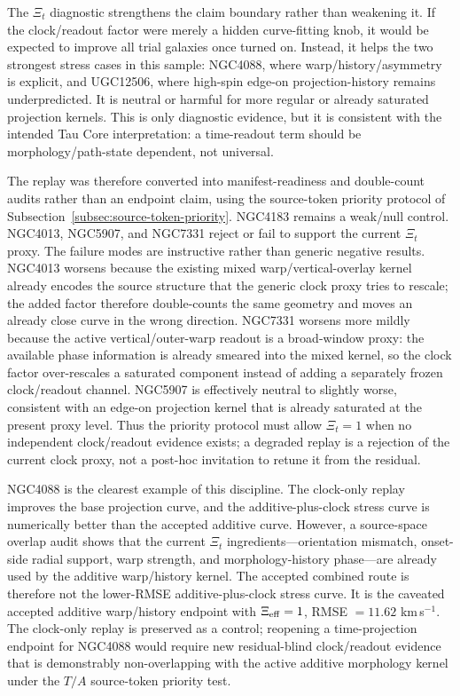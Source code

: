 \documentclass[11pt]{article}
\begin{document}
The \(\Xi_t\) diagnostic strengthens the claim boundary rather than weakening
it.  If the clock/readout factor were merely a hidden curve-fitting knob, it
would be expected to improve all trial galaxies once turned on.  Instead, it
helps the two strongest stress cases in this sample: NGC4088, where
warp/history/asymmetry is explicit, and UGC12506, where high-spin edge-on
projection-history remains underpredicted.  It is neutral or harmful for more
regular or already saturated projection kernels.  This is only diagnostic
evidence, but it is consistent with the intended Tau Core interpretation: a
time-readout term should be morphology/path-state dependent, not universal.

The replay was therefore converted into manifest-readiness and double-count
audits rather than an endpoint claim, using the source-token priority protocol
of Subsection~\ref{subsec:source-token-priority}.  NGC4183 remains a weak/null control.
NGC4013, NGC5907, and NGC7331 reject or fail to support the current
\(\Xi_t\) proxy.  The failure modes are instructive rather than generic
negative results.  NGC4013 worsens because the existing mixed
warp/vertical-overlay kernel already encodes the source structure that the
generic clock proxy tries to rescale; the added factor therefore double-counts
the same geometry and moves an already close curve in the wrong direction.
NGC7331 worsens more mildly because the active vertical/outer-warp readout is
a broad-window proxy: the available phase information is already smeared into
the mixed kernel, so the clock factor over-rescales a saturated component
instead of adding a separately frozen clock/readout channel.  NGC5907 is
effectively neutral to slightly worse, consistent with an edge-on projection
kernel that is already saturated at the present proxy level.  Thus the
priority protocol must allow \(\Xi_t=1\) when no independent clock/readout evidence
exists; a degraded replay is a rejection of the current clock proxy, not a
post-hoc invitation to retune it from the residual.

NGC4088 is the clearest example of this discipline.  The clock-only replay
improves the base projection curve, and the additive-plus-clock stress curve is
numerically better than the accepted additive curve.  However, a source-space
overlap audit shows that the current \(\Xi_t\) ingredients---orientation
mismatch, onset-side radial support, warp strength, and morphology-history
phase---are already used by the additive warp/history kernel.  The accepted
combined route is therefore not the lower-RMSE additive-plus-clock stress
curve.  It is the caveated accepted additive warp/history endpoint with
\(\Xi_{\rm eff}=1\), RMSE \(=11.62\) km\,s\(^{-1}\).  The clock-only replay is
preserved as a control; reopening a time-projection endpoint for NGC4088 would
require new residual-blind clock/readout evidence that is demonstrably
non-overlapping with the active additive morphology kernel under the
\(T/A\) source-token priority test.
\end{document}
